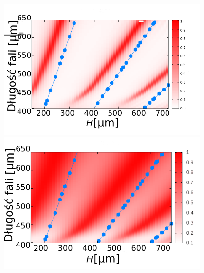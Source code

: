 \documentclass{beamer}
\begin{document}
\begin{frame}
\begin{columns}
\begin{column}{0.5\textwidth}
		\end{column}
		\begin{column}{0.5\textwidth}
			\begin{figure}[htb]
				\includegraphics[width=.9\textwidth]{../images/antenaThz/rezonant_trans_f01.png}\\
				\includegraphics[width=.9\textwidth]{../images/antenaThz/rezonant_trans_f05.png}\\
			\end{figure}
		\end{column}
	\end{columns}
	{\tiny \cite{martin2001theory}	}
	
\end{frame}
\end{document}
